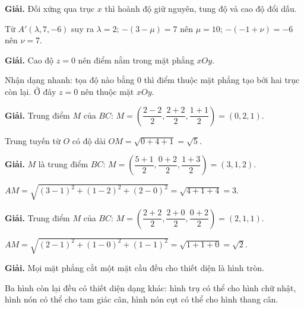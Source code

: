 \documentclass[11pt, a4paper]{article}
\begin{document}
\vspace{0.3cm}
\begin{dapan}[6 — Đáp án C]

\textbf{Giải.} Đối xứng qua trục $x$ thì hoành độ giữ nguyên, tung độ và cao độ đổi dấu.

Từ $A'(\lambda, 7, -6)$ suy ra $\lambda = 2$; $-(3-\mu) = 7$ nên $\mu = 10$; $-(-1+\nu) = -6$ nên $\nu = 7$.


\end{dapan}
\vspace{0.3cm}
\begin{dapan}[7 — Đáp án B]

\textbf{Giải.} Cao độ $z = 0$ nên điểm nằm trong mặt phẳng $xOy$.

Nhận dạng nhanh: tọa độ nào bằng $0$ thì điểm thuộc mặt phẳng tạo bởi hai trục còn lại. Ở đây $z = 0$ nên thuộc mặt $xOy$.


\end{dapan}
\vspace{0.3cm}
\begin{dapan}[8 — Đáp án D]

\textbf{Giải.} Trung điểm $M$ của $BC$: $M = \left(\dfrac{2-2}{2}, \dfrac{2+2}{2}, \dfrac{1+1}{2}\right) = (0,2,1)$.

Trung tuyến từ $O$ có độ dài $OM = \sqrt{0 + 4 + 1} = \sqrt{5}$.


\end{dapan}
\vspace{0.3cm}
\begin{dapan}[9 — Đáp án B]

\textbf{Giải.} $M$ là trung điểm $BC$: $M = \left(\dfrac{5+1}{2}, \dfrac{0+2}{2}, \dfrac{1+3}{2}\right) = (3,1,2)$.

$AM = \sqrt{(3-1)^2 + (1-2)^2 + (2-0)^2} = \sqrt{4+1+4} = 3$.


\end{dapan}
\vspace{0.3cm}
\begin{dapan}[10 — Đáp án B]

\textbf{Giải.} Trung điểm $M$ của $BC$: $M = \left(\dfrac{2+2}{2}, \dfrac{2+0}{2}, \dfrac{0+2}{2}\right) = (2,1,1)$.

$AM = \sqrt{(2-1)^2 + (1-0)^2 + (1-1)^2} = \sqrt{1+1+0} = \sqrt{2}$.


\end{dapan}
\vspace{0.3cm}
\begin{dapan}[11 — Đáp án C]

\textbf{Giải.} Mọi mặt phẳng cắt một mặt cầu đều cho thiết diện là hình tròn.

Ba hình còn lại đều có thiết diện dạng khác: hình trụ có thể cho hình chữ nhật, hình nón có thể cho tam giác cân, hình nón cụt có thể cho hình thang cân.


\end{dapan}
\end{document}
